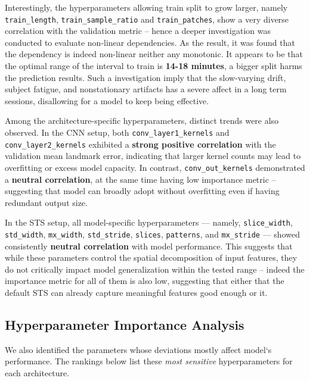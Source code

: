 Interestingly, the hyperparameters allowing train split to grow larger, namely \texttt{train\_length}, \texttt{train\_sample\_ratio} and \texttt{train\_patches}, show a very diverse correlation with the validation metric -- hence a deeper investigation was conducted to evaluate non-linear dependencies. As the result, it was found that the dependency is indeed non-linear neither any monotonic. It appears to be that the optimal range of the interval to train is \textbf{14-18 minutes}, a bigger split harms the prediction results. Such a  investigation imply that the slow-varying drift, subject fatigue, and nonstationary artifacts has a severe affect in a long term sessions, disallowing for a model to keep being effective.

Among the architecture-specific hyperparameters, distinct trends were also observed. 
In the CNN setup, both \texttt{conv\_layer1\_kernels} and \texttt{conv\_layer2\_kernels} exhibited a \textbf{strong positive correlation} with the validation mean landmark error, 
indicating that larger kernel counts may lead to overfitting or excess model capacity. 
In contrast, \texttt{conv\_out\_kernels} demonstrated a \textbf{neutral correlation}, at the same time having low importance metric -- suggesting that model can broadly adopt without overfitting even if having redundant output size.

In the STS setup, all model-specific hyperparameters — namely, 
\texttt{slice\_width}, \texttt{std\_width}, \texttt{mx\_width}, \texttt{std\_stride}, \texttt{slices}, \texttt{patterns}, and \texttt{mx\_stride} — showed consistently \textbf{neutral correlation} 
with model performance. This suggests that while these parameters control the spatial decomposition of input features, they do not critically impact model generalization within the tested range -- indeed the importance metric for all of them is also low, suggesting that either that the default STS can already capture meaningful features good enough or it.

\subsection{Hyperparameter Importance Analysis}
We also identified the parameters whose deviations mostly affect model`s performance.  
The rankings below list these \emph{most sensitive} hyperparameters for each architecture.

